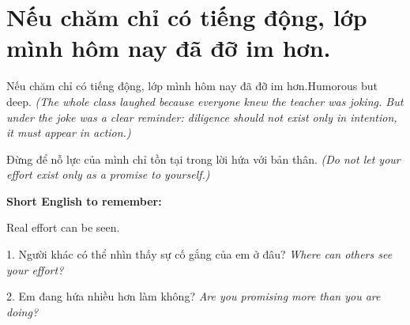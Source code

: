 \section{Nếu chăm chỉ có tiếng động, lớp mình hôm nay đã đỡ im hơn.}
\begin{truyen}{Nếu chăm chỉ có tiếng động, lớp mình hôm nay đã đỡ im hơn.}{Humorous but deep.}
\textit{(The whole class laughed because everyone knew the teacher was joking. But under the joke was a clear reminder: diligence should not exist only in intention, it must appear in action.)}
\end{truyen}

\begin{baihoc}
Đừng để nỗ lực của mình chỉ tồn tại trong lời hứa với bản thân.
\textit{(Do not let your effort exist only as a promise to yourself.)}
\end{baihoc}

\begin{ghinhoanh}
\textbf{Short English to remember:}

Real effort can be seen.

\end{ghinhoanh}

\begin{tuhocnhanh}
1. Người khác có thể nhìn thấy sự cố gắng của em ở đâu? \textit{Where can others see your effort?}

2. Em đang hứa nhiều hơn làm không? \textit{Are you promising more than you are doing?}
\end{tuhocnhanh}
\ngancach